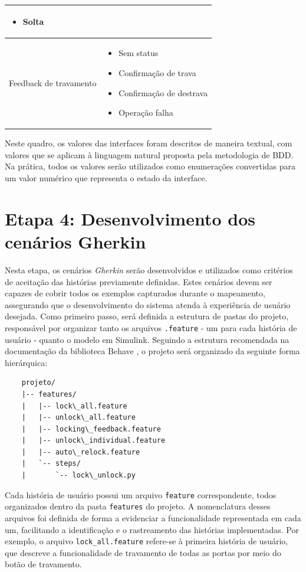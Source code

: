 \begin{quadro}[h]
\begin{tabular}{|p{5cm}|p{7cm}|}
\begin{itemize}[topsep=0pt, partopsep=0pt, leftmargin=*]
    \item Solta
\end{itemize} \\
\hline
Feedback de travamento &
\begin{itemize}[topsep=0pt, partopsep=0pt, leftmargin=*]
    \item Sem status
    \item Confirmação de trava
    \item Confirmação de destrava
    \item Operação falha
\end{itemize} \\
\hline
\end{tabular}
\end{quadro}

Neste quadro, os valores das interfaces foram descritos de maneira textual, com valores que se aplicam à linguagem natural proposta pela metodologia de BDD. 
Na prática, todos os valores serão utilizados como enumerações convertidas para um valor numérico que representa o estado da interface.

\section{\textbf{Etapa 4: Desenvolvimento dos cenários Gherkin}}
\label{sbs:etapa4}
Nesta etapa, os cenários \textit{Gherkin} serão desenvolvidos e utilizados como critérios de aceitação das histórias previamente definidas. Estes cenários devem ser capazes 
de cobrir todos os exemplos capturados durante o mapeamento, assegurando que o desenvolvimento do sistema atenda à experiência de usuário desejada.
Como primeiro passo, será definida a estrutura de pastas do projeto, responsável por organizar tanto os arquivos \texttt{.feature} - um para cada história de usuário - 
quanto o modelo em Simulink. Seguindo a estrutura recomendada na documentação da biblioteca Behave \cite{behaveDocs}, o projeto será organizado da seguinte forma hierárquica:

\begin{verbatim}
    projeto/
    |-- features/
    |   |-- lock\_all.feature
    |   |-- unlock\_all.feature
    |   |-- locking\_feedback.feature
    |   |-- unlock\_individual.feature
    |   |-- auto\_relock.feature
    |   `-- steps/
    |       `-- lock\_unlock.py
\end{verbatim}

Cada história de usuário possui um arquivo \texttt{\.feature} correspondente, todos organizados dentro da pasta \texttt{features} do projeto. A nomenclatura desses 
arquivos foi definida de forma a evidenciar a funcionalidade representada em cada um, facilitando a identificação e o rastreamento das histórias implementadas. 
Por exemplo, o arquivo \texttt{lock\_all.feature} refere-se à primeira história de usuário, que descreve a funcionalidade de travamento de todas as portas 
por meio do botão de travamento.

